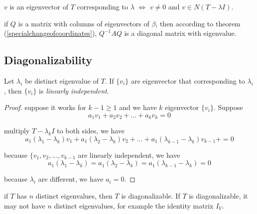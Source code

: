 \begin{theorem}
    $v$ is an eigenvector of $T$ corresponding to $\lambda$ $\iff$ $v \neq 0$ and $v \in N(T - \lambda I)$.
\end{theorem}

\begin{theorem}
    if $Q$ is a matrix with columns of eigenvectors of $\beta$, then according to theorem (\ref{specialchangeofcoordinates}), $Q^{-1} A Q$ is a diagonal matrix with eigenvalue.
\end{theorem}



\subsection{Diagonalizability}


\begin{theorem}
    Let ${\lambda_i}$ be distinct eigenvalue of $T$. If $\{v_i\}$ are eigenvector that corresponding to $\lambda_i$, then $\{v_i\}$ is \emph{linearly independent}.
\end{theorem}
\begin{proof}
    suppose it works for $k - 1 \geq 1$ and we have $k$ eigenvector $\{ v_i\}$. Suppose
    \begin{equation*}
        a_1 v_1 + a_2 v_2 + \dots + a_k v_k = 0
    \end{equation*}
    
    multiply $T - \lambda_k I$ to both sides, we have
    \begin{equation*}
        a_1(\lambda_1 - \lambda_k) v_1 + a_1(\lambda_2 - \lambda_k) v_2 +  \dots + a_1(\lambda_{k-1} - \lambda_k) v_{k-1} +  = 0
    \end{equation*}
    
    because $\{v_1, v_2, \dots, v_{k-1}$ are linearly independent, we have 
    \begin{equation*}
        a_1(\lambda_1 - \lambda_k) = a_1(\lambda_2 - \lambda_k) =  a_1(\lambda_{k-1} - \lambda_k) = 0
    \end{equation*}
    
    because $\lambda_i$ are different, we have $a_i = 0$.
\end{proof}

\begin{theorem}
    if $T$ has $n$ distinct eigenvalues, then $T$ is diagonalizable. If $T$ is diagonalizable, it may not have $n$ distinct eigenvalues, for example the identity matrix $I_V$.
\end{theorem}

